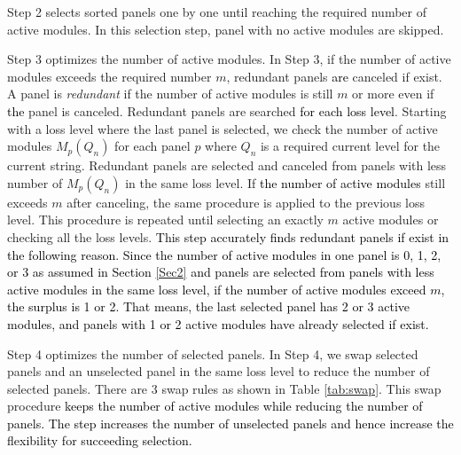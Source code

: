 \documentclass[conference]{pvsctran}
\newcommand{\michiko}{\textcolor{black}}
\newcommand{\zhao}{\textcolor{black}}
\begin{document}
Step 2 selects sorted panels one by one until reaching the required number of active modules.
In this selection step, panel with no active modules are skipped.

Step 3 optimizes the number of active modules. 
In Step 3, if the number of active modules exceeds the required number $m$, redundant panels \zhao{are} canceled if exist. 
A panel is \textit{redundant} if the number of active modules is still $m$ or more even if \zhao{the} panel is canceled.
Redundant panels are searched \michiko{for each loss level}. 
Starting with a loss level where the last panel is selected, we check the number of active modules $M_{p}(Q_{n})$ for each panel $p$ 
where $Q_{n}$ is a required current level for the current string.
Redundant panels are selected and canceled from panels with less number of $M_{p}(Q_{n})$ in the same loss level. 
If \michiko{the number of active modules} still exceeds $m$ after canceling,
the same procedure is applied to the previous loss level.
This procedure is repeated until selecting an exactly $m$ active modules or checking all the loss levels.
\michiko{This step accurately finds redundant panels if exist in the following reason. Since the number of active modules in one panel is 0, 1, 2, or 3 \zhao{as assumed in Section \ref{Sec2}} and panels are selected from panels with less active modules in the same loss level, if the number of active modules exceed $m$, the surplus is 1 or 2. That means, the last selected panel has 2 or 3 active modules, and panels with 1 or 2 active modules have already selected if exist.}

Step 4 optimizes the number of selected panels.
In Step 4, we swap selected panels and an unselected panel in the same loss level to reduce the number of selected panels.
There are 3 swap rules as shown in Table \ref{tab:swap}.
This swap procedure \michiko{keeps the number of active modules while reducing the number of panels. The step increases the number of unselected panels and hence increase the flexibility for succeeding selection.}
\end{document}
